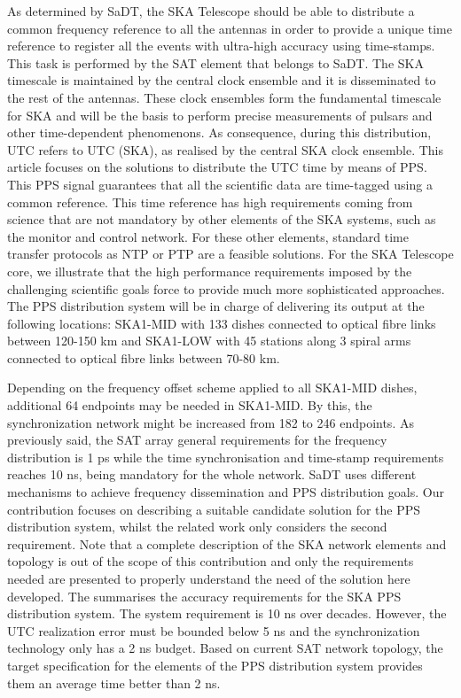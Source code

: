 As determined by SaDT, the SKA Telescope should be able to distribute a common
frequency reference to all the antennas in order to provide a unique time reference
to register all the events with ultra-high accuracy using time-stamps. This
task is performed by the SAT element that belongs to
SaDT. The SKA timescale is maintained by the central clock ensemble and it is disseminated to the rest of the antennas. These clock ensembles
form the fundamental timescale for SKA and will be the basis to perform precise
measurements of pulsars and other time-dependent phenomenons. As consequence,
during this distribution, UTC refers to UTC (SKA), as realised by the central
SKA clock ensemble.  This article focuses on the solutions to distribute
the UTC time by means of PPS. This PPS signal guarantees that all the
scientific data are time-tagged using a common reference. This time reference has
high requirements coming from science that are not mandatory by other elements
of the SKA systems, such as the monitor and control network. For these other
elements, standard time transfer protocols as NTP or PTP are a feasible
solutions. For the SKA Telescope core, we illustrate that the high performance
requirements imposed by the challenging scientific goals force to provide much
more sophisticated approaches.  The PPS distribution system will be in charge
of delivering its output at the following locations: SKA1-MID with 133 dishes
connected to optical fibre links between 120-150 km and SKA1-LOW with 45
stations along 3 spiral arms connected to optical fibre links between 70-80 km.

Depending on the frequency offset scheme applied to all SKA1-MID dishes,
additional 64 endpoints may be needed in SKA1-MID. By this, the synchronization
network might be increased from 182 to 246 endpoints.  
As previously said, the SAT array general requirements for the frequency distribution is 1 ps 
while the time synchronisation and time-stamp requirements reaches 10 ns, being mandatory for the whole network.
SaDT uses different mechanisms to achieve frequency dissemination and PPS distribution goals. 
Our contribution  focuses on describing a  suitable candidate solution for the PPS
distribution system, whilst the related work only considers the second requirement. Note that
a complete description of the SKA network elements and topology is out of the
scope of this contribution and only the requirements needed are presented to
properly understand the need of the solution here developed. The \cite{paultests} summarises the accuracy requirements for the SKA PPS distribution system. The system requirement is 10 ns over decades. However, the UTC realization error must be bounded below 5 ns and the synchronization technology only has a 2 ns budget.
Based on current SAT network topology, the target specification for the elements of the PPS distribution system provides them an average time better than 2 ns.

